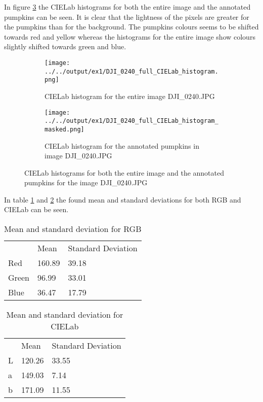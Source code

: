 \documentclass[../Head/Main.tex]{subfiles}
\begin{document}
In figure \ref{fig:cielab_hist} the CIELab histograms for both the entire image and the annotated pumpkins can be seen. It is clear that the lightness of the pixels are greater for the pumpkins than for the background. The pumpkins colours seems to be shifted towards red and yellow whereas the histograms for the entire image show colours slightly shifted towards green and blue.

\begin{figure}[H]
	\centering
	\begin{subfigure}{0.49\textwidth}
		\centering
		\texttt{[image: ../../output/ex1/DJI\_0240\_full\_CIELab\_histogram.png]}
		\caption{CIELab histogram for the entire image DJI\_0240.JPG}
		\label{fig:cielab_hist_full}
	\end{subfigure}
	\begin{subfigure}{0.49\textwidth}
		\centering
		\texttt{[image: ../../output/ex1/DJI\_0240\_full\_CIELab\_histogram\_masked.png]}
		\caption{CIELab histogram for the annotated pumpkins in image DJI\_0240.JPG}
		\label{fig:cielab_hist_masked}
	\end{subfigure}
	\caption{CIELab histograms for both the entire image and the annotated pumpkins for the image DJI\_0240.JPG}
	\label{fig:cielab_hist}
\end{figure}

In table \ref{tab:mean_stdiv_rgb} and \ref{tab:mean_stdiv_cielab} the found mean and standard deviations for both RGB and CIELab can be seen.\par 
\begin{minipage}{0.49\textwidth}
	\centering
	\begin{table}[H]
\centering
\begin{tabular}{lll}
      & Mean   & Standard Deviation \\
Red   & 160.89 & 39.18              \\
Green & 96.99  & 33.01              \\
Blue  & 36.47  & 17.79             
\end{tabular}
\caption{Mean and standard deviation for RGB}
\label{tab:mean_stdiv_rgb}
\end{table}
\end{minipage}
\begin{minipage}{0.49\textwidth}
	\centering
	\begin{table}[H]
\centering
\begin{tabular}{lll}
  & Mean   & Standard Deviation \\
L & 120.26 & 33.55              \\
a & 149.03  & 7.14              \\
b & 171.09  & 11.55             
\end{tabular}
\caption{Mean and standard deviation for CIELab}
\label{tab:mean_stdiv_cielab}
\end{table}
\end{minipage}






\end{document}
